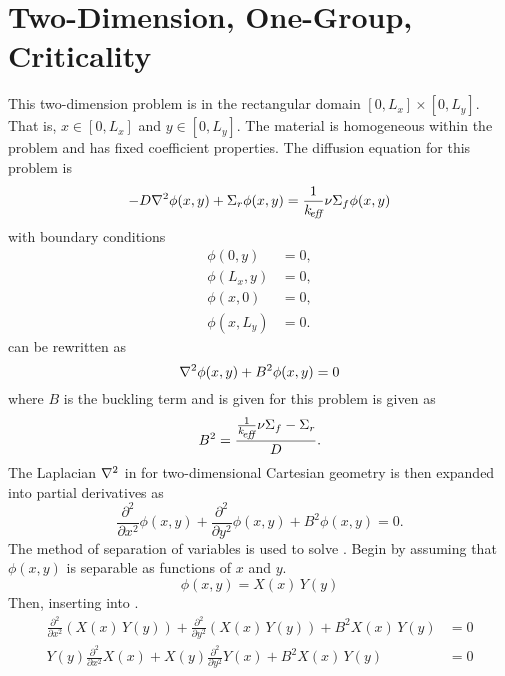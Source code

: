 \section{Two-Dimension, One-Group, Criticality}
  \label{sec:deriv_2d1g}
  This two-dimension problem is in the rectangular domain $[0,L_x] \times
  [0,L_y]$. That is, $x \in [0,L_x]$ and $y \in [0,L_y]$. The material is
  homogeneous within the problem and has fixed coefficient properties. The
  diffusion equation for this problem is 
  \begin{equation}
    \label{eq:2d1g}
    -D \mathbf{\nabla}^2 \phi(x,y) + \Sigma_r \phi(x,y) = 
      \frac{1}{k_{\!\mbox{\scriptsize \em eff}}} \nu \Sigma_f \phi(x,y)
  \end{equation}
  with boundary conditions
  \begin{align}
    \label{eq:2d1g_bc1}
    \phi(0,y) &= 0 ,\\
    \label{eq:2d1g_bc2}
    \phi(L_x,y) &= 0 ,\\
    \label{eq:2d1g_bc3}
    \phi(x,0) &= 0 ,\\
    \label{eq:2d1g_bc4}
    \phi(x,L_y) &= 0.
  \end{align}
   can be rewritten as
  \begin{equation}
    \label{eq:2d1g_buckle}
    \mathbf{\nabla}^2 \phi(x,y) + B^2 \phi(x,y) = 0
  \end{equation}
  where $B$ is the buckling term and is given for this problem is given as
  \begin{equation}
    \label{eq:2d1g_b2}
    B^2 = \frac{\frac{1}{k_{\!\mbox{\scriptsize \em eff}}} \nu \Sigma_f - \Sigma_r}{D}.
  \end{equation}
  The Laplacian $\mathbf{\nabla}^2$ in  for two-dimensional Cartesian
  geometry is then expanded into partial derivatives as
  \begin{equation}
    \label{eq:2d1g_partial}
    \frac{\partial^2}{\partial x^2} \phi(x,y) + \frac{\partial^2}{\partial y^2}
      \phi(x,y) + B^2 \phi(x,y) = 0.
  \end{equation}
  The method of separation of variables is used to solve
  . Begin by assuming that $\phi(x,y)$ is separable as
  functions of $x$ and $y$.
  \begin{equation}
    \label{eq:2d1g_separable}
    \phi(x,y) = X(x)\,Y(y)
  \end{equation}
  Then, inserting  into .
  \begin{align}
    \frac{\partial^2}{\partial x^2} \left( X(x)\,Y(y) \right) + 
      \frac{\partial^2}{\partial y^2} \left( X(x)\,Y(y) \right) + 
      B^2 X(x)\,Y(y) &= 0 \\
    \label{eq:2d1g_above}
    Y(y) \frac{\partial^2}{\partial x^2} X(x) + 
      X(y) \frac{\partial^2}{\partial y^2} Y(x) + 
      B^2 X(x) \, Y(y) &= 0
  \end{align}
